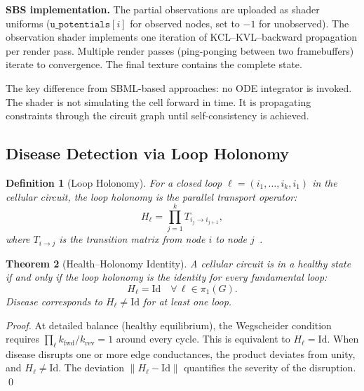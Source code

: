 \documentclass[11pt,twocolumn,a4paper]{article}
\newtheorem{theorem}{Theorem}[section]
\newtheorem{definition}[theorem]{Definition}
\begin{document}
\textbf{SBS implementation.}  The partial observations are uploaded
as shader uniforms ($\texttt{u\_potentials}[i]$ for observed nodes,
set to $-1$ for unobserved).  The observation shader implements one
iteration of KCL--KVL--backward propagation per render pass.  Multiple
render passes (ping-ponging between two framebuffers) iterate to
convergence.  The final texture contains the complete state.

The key difference from SBML-based approaches: no ODE integrator is
invoked.  The shader is not simulating the cell forward in time.  It
is propagating constraints through the circuit graph until
self-consistency is achieved.

\subsection{Disease Detection via Loop Holonomy}

\begin{definition}[Loop Holonomy]
\label{def:holonomy}
For a closed loop $\ell = (i_1, \ldots, i_k, i_1)$ in the cellular
circuit, the \emph{loop holonomy} is the parallel transport operator:
\begin{equation}
  H_\ell = \prod_{j=1}^{k} T_{i_j \to i_{j+1}},
  \label{eq:holonomy}
\end{equation}
where $T_{i \to j}$ is the transition matrix from node $i$ to node
$j$~\citep{nakahara2003,kobayashi1963}.
\end{definition}

\begin{theorem}[Health--Holonomy Identity]
\label{thm:health-holonomy}
A cellular circuit is in a healthy state if and only if the loop
holonomy is the identity for every fundamental loop:
\begin{equation}
  H_\ell = \mathrm{Id} \quad \forall\, \ell \in \pi_1(G).
  \label{eq:health}
\end{equation}
Disease corresponds to $H_\ell \neq \mathrm{Id}$ for at least one
loop.
\end{theorem}

\begin{proof}
At detailed balance (healthy equilibrium), the Wegscheider
condition~\citep{wegscheider1901} requires
$\prod_\ell k_{\mathrm{fwd}} / k_{\mathrm{rev}} = 1$ around every
cycle.  This is equivalent to $H_\ell = \mathrm{Id}$.  When disease
disrupts one or more edge conductances, the product deviates from
unity, and $H_\ell \neq \mathrm{Id}$.  The deviation
$\|H_\ell - \mathrm{Id}\|$ quantifies the severity of the
disruption.  \qed
\end{proof}
\end{document}
